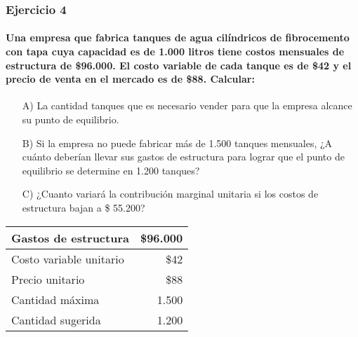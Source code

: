 \documentclass[12pt,a4paper]{article}
\newcommand{\consigna}[1]{\paragraph{\indent #1} \hspace{0pt}}
\begin{document}
        
        \newpage
    
    	\subsubsection{Ejercicio 4}
        
        \consigna{
        	Una empresa que fabrica tanques de agua cilíndricos de fibrocemento con tapa cuya capacidad es de 1.000 litros tiene costos mensuales de estructura de \$96.000.
            El costo variable de cada tanque es de \$42 y el precio de venta en el mercado es de \$88.
            Calcular:
        	}
            
            \begin{itemize}
				\item[A)]	La cantidad tanques que es necesario vender para que la empresa alcance su punto de equilibrio.
                \item[B)]	Si la empresa no puede fabricar más de 1.500 tanques mensuales, ¿A cuánto deberían llevar sus gastos de estructura para lograr que el punto de equilibrio se determine en 1.200 tanques?
                \item[C)]	¿Cuanto variará la contribución marginal unitaria si los costos de estructura bajan a \$ 55.200?
			\end{itemize}
            
            \begin{table}[H]
            \centering
            	\begin{tabular}{ | l | r | }
                	\hline
                    Gastos de estructura	&	\$96.000	\\ \hline
                    Costo variable unitario	&	\$42		\\ \hline
                    Precio unitario			&	\$88		\\ \hline
                    Cantidad máxima			&	1.500		\\ \hline
                    Cantidad sugerida		&	1.200		\\ \hline
				\end{tabular}
			\end{table}
        
\end{document}
